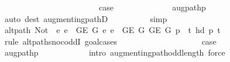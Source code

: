 \begin{isabellebody}
\isanewline
\ \ \ \ \ \ \ \ \ \ \isamarkupfalse%
\ {}\isanewline
\ \ \ \ \ \ \ \ \ \ \isamarkupfalse%
\ {\isacharquery}{\kern0pt}case\isanewline
\ \ \ \ \ \ \ \ \ \ \ \ \isamarkupfalse%
\ augpath{\isacharunderscore}{\kern0pt}p{\isacharprime}{\kern0pt}\isanewline
\ \ \ \ \ \ \ \ \ \ \ \ \isamarkupfalse%
\ {\isacharparenleft}{\kern0pt}auto\ dest{\isacharcolon}{\kern0pt}\ augmenting{\isacharunderscore}{\kern0pt}pathD{\isacharparenleft}{\kern0pt}{}{\isacharparenright}{\kern0pt}{\isacharparenright}{\kern0pt}\isanewline
\ \ \ \ \ \ \ \ \isamarkupfalse%
\ simp{\isacharplus}{\kern0pt}\isanewline
\ \ \ \ \ \ \isamarkupfalse%
\isanewline
\ \ \ \ \ \ \isamarkupfalse%
\ {\isachardoublequoteopen}alt{\isacharunderscore}{\kern0pt}path\ {\isacharparenleft}{\kern0pt}Not\ {\isasymcirc}\ {\isacharparenleft}{\kern0pt}{\isasymlambda}e{\isachardot}{\kern0pt}\ e\ {\isasymin}\ G{\isachardot}{\kern0pt}E\ {\isacharquery}{\kern0pt}G{}{\isacharparenright}{\kern0pt}{\isacharparenright}{\kern0pt}\ {\isacharparenleft}{\kern0pt}{\isasymlambda}e{\isachardot}{\kern0pt}\ e\ {\isasymin}\ G{\isachardot}{\kern0pt}E\ {\isacharquery}{\kern0pt}G{}{\isacharparenright}{\kern0pt}\ {\isacharparenleft}{\kern0pt}G{\isachardot}{\kern0pt}E\ {\isacharquery}{\kern0pt}G{\isacharparenright}{\kern0pt}\ {\isacharparenleft}{\kern0pt}p{\isacharprime}{\kern0pt}\ {\isacharat}{\kern0pt}\ {\isacharbrackleft}{\kern0pt}t{\isacharbrackright}{\kern0pt}{\isacharparenright}{\kern0pt}\ {\isacharparenleft}{\kern0pt}hd\ p{\isacharprime}{\kern0pt}{\isacharparenright}{\kern0pt}\ t{\isachardoublequoteclose}\isanewline
\ \ \ \ \ \ \isamarkupfalse%
\ {\isacharparenleft}{\kern0pt}rule\ alt{\isacharunderscore}{\kern0pt}path{\isacharunderscore}{\kern0pt}snoc{\isacharunderscore}{\kern0pt}oddI{\isacharcomma}{\kern0pt}\ goal{\isacharunderscore}{\kern0pt}cases{\isacharparenright}{\kern0pt}\isanewline
\ \ \ \ \ \ \ \ \isamarkupfalse%
\ {}\isanewline
\ \ \ \ \ \ \ \ \isamarkupfalse%
\ {\isacharquery}{\kern0pt}case\isanewline
\ \ \ \ \ \ \ \ \ \ \isamarkupfalse%
\ augpath{\isacharunderscore}{\kern0pt}p{\isacharprime}{\kern0pt}\isanewline
\ \ \ \ \ \ \ \ \ \ \isamarkupfalse%
\ {\isacharparenleft}{\kern0pt}intro\ augmenting{\isacharunderscore}{\kern0pt}path{\isacharunderscore}{\kern0pt}odd{\isacharunderscore}{\kern0pt}length{\isacharparenright}{\kern0pt}\ force\isanewline
\ \ \ \ \ \ \isamarkupfalse%

\end{isabellebody}

